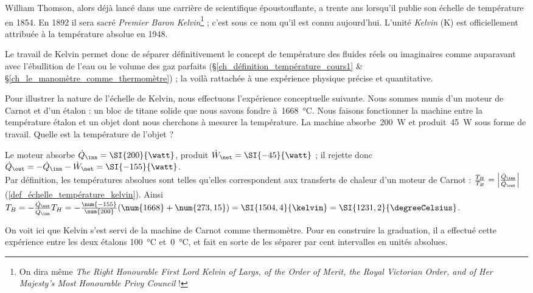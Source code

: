 		William Thomson, alors déjà lancé dans une carrière de scientifique époustouflante,  a trente ans lorsqu’il publie son échelle de température en 1854. En 1892 il sera sacré \textit{Premier Baron Kelvin}\footnote{On dira même \textit{The Right Honourable First Lord Kelvin of Largs, of the Order of Merit, the Royal Victorian Order, and of Her Majesty's Most Honourable Privy Council} !} ; c’est sous ce nom qu’il est connu aujourd’hui. L’unité \textit{Kelvin} (\si{\kelvin}) est officiellement attribuée à la température absolue en 1948.
		
		Le travail de Kelvin permet donc de séparer définitivement le concept de température des fluides réels ou imaginaires comme auparavant avec l’ébullition de l’eau ou le volume des gaz parfaits (\S\ref{ch_définition_température_cours1} \& \S\ref{ch_le_manomètre_comme_thermomètre}) ; la voilà rattachée à une expérience physique précise et quantitative.

		\begin{anexample}
			Pour illustrer la nature de l’échelle de Kelvin, nous effectuons l’expérience conceptuelle suivante. Nous sommes munis d’un moteur de Carnot et d’un étalon : un bloc de titane solide que nous savons fondre à~\SI{1668}{\degreeCelsius}. Nous faisons fonctionner la machine entre la température étalon et un objet dont nous cherchons à mesurer la température. La machine absorbe~\SI{200}{\watt} et produit~\SI{45}{\watt} sous forme de travail. Quelle est la température de l’objet ?
				\begin{answer}
					Le moteur absorbe $\dot Q_\inn = \SI{200}{\watt}$, produit $\dot W_\net = \SI{-45}{\watt}$ ; il rejette donc $\dot Q_\out = - \dot Q_\inn - \dot W_\net = \SI{-155}{\watt}$. \\
					Par définition, les températures absolues sont telles qu’elles correspondent aux transferts de chaleur d’un moteur de Carnot : $\frac{T_H}{T_B} = \left|\frac{\dot Q_\inn}{\dot Q_\out}\right|$ (\ref{def_échelle_température_kelvin}). Ainsi $T_B = -\frac{\dot Q_\out}{\dot Q_\inn} T_H = -\frac{\num{-155}}{\num{200}} (\num{1668} + \num{273,15}) = \SI{1504,4}{\kelvin} = \SI{1231,2}{\degreeCelsius}$.
				\end{answer}
					\begin{remark}On voit ici que Kelvin s’est servi de la machine de Carnot comme thermomètre. Pour en construire la graduation, il a effectué cette expérience entre les deux étalons \SI{100}{\degreeCelsius} et~\SI{0}{\degreeCelsius}, et fait en sorte de les séparer par cent intervalles en unités absolues.\end{remark}
		\end{anexample}

